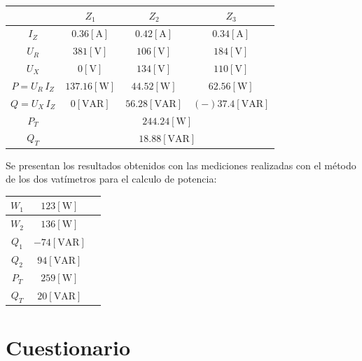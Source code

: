 \documentclass[letter,11pt]{article}
\begin{document}
\begin{center}
    \begin{tabular}{|c||c|c|c|}
    \hline
    & \textbf{$Z_1$} & $Z_2$ & $Z_3$
    \tabularnewline \hline \hline
    $I_Z$ &
    $0.36[\text{A}]$ &
    $0.42[\text{A}]$ &
    $0.34[\text{A}]$
    \tabularnewline \hline \hline
    $U_R$ &
    $381[\text{V}]$ &
    $106[\text{V}]$ &
    $184[\text{V}]$
    \tabularnewline \hline
    $U_X$ &
    $0[\text{V}]$ &
    $134[\text{V}]$ &
    $110[\text{V}]$
    \tabularnewline \hline \hline
    $P=U_R\,I_Z$ &
    $137.16[\text{W}]$ &
    $44.52[\text{W}]$ &
    $62.56[\text{W}]$
    \tabularnewline \hline
    $Q=U_X\,I_Z$ &
    $0[\text{VAR}]$ &
    $56.28[\text{VAR}]$ &
    $(-)37.4[\text{VAR}]$
    \tabularnewline \hline \hline
    $P_T$ &
    \multicolumn{3}{|c|}{$244.24[\text{W}]$}
    \tabularnewline \hline
    $Q_T$ &
    \multicolumn{3}{|c|}{$18.88[\text{VAR}]$}
    \tabularnewline \hline
    \end{tabular}
\end{center}

Se presentan los resultados obtenidos con las mediciones realizadas con el
método de los dos vatímetros para el calculo de potencia:

\begin{center}
    \begin{tabular}{|c||c|c|}
    \hline
    $W_1$ & $123[\text{W}]$
    \tabularnewline \hline
    $W_2$ & $136[\text{W}]$
    \tabularnewline \hline \hline
    $Q_1$ & $-74[\text{VAR}]$
    \tabularnewline \hline
    $Q_2$ & $94[\text{VAR}]$
    \tabularnewline \hline \hline
    $P_T$ & $259[\text{W}]$
    \tabularnewline \hline
    $Q_T$ & $20[\text{VAR}]$
    \tabularnewline \hline
    \end{tabular}
\end{center}

\section{Cuestionario}
\end{document}
